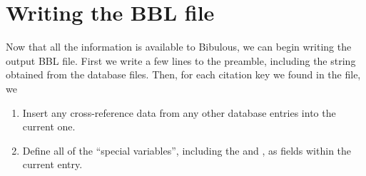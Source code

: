 \documentclass[letterpaper,10pt,english]{sphinxmanual}
\begin{document}
\section{Writing the BBL file}
\label{\detokenize{developer_guide:writing-the-bbl-file}}
Now that all the information is available to Bibulous, we can begin writing the output BBL file. First we write a few lines to the preamble, including the  string obtained from the  database files. Then, for each citation key we found in the  file, we
\begin{enumerate}
\item {} 
Insert any cross-reference data from any other database entries into the current one.

\item {} 
Define all of the “special variables”, including the  and , as fields within the current entry.

\end{enumerate}
\end{document}
